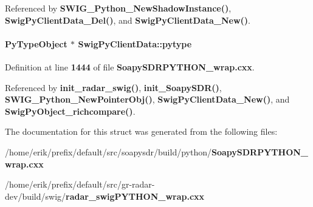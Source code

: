 Referenced by {\bf S\+W\+I\+G\+\_\+\+Python\+\_\+\+New\+Shadow\+Instance()}, {\bf Swig\+Py\+Client\+Data\+\_\+\+Del()}, and {\bf Swig\+Py\+Client\+Data\+\_\+\+New()}.

\paragraph[{pytype}]{\setlength{\rightskip}{0pt plus 5cm}Py\+Type\+Object $\ast$ Swig\+Py\+Client\+Data\+::pytype}\label{structSwigPyClientData_a489eefb474298d8b2c2e7d6d2583ca98}


Definition at line {\bf 1444} of file {\bf Soapy\+S\+D\+R\+P\+Y\+T\+H\+O\+N\+\_\+wrap.\+cxx}.



Referenced by {\bf init\+\_\+radar\+\_\+swig()}, {\bf init\+\_\+\+Soapy\+S\+D\+R()}, {\bf S\+W\+I\+G\+\_\+\+Python\+\_\+\+New\+Pointer\+Obj()}, {\bf Swig\+Py\+Client\+Data\+\_\+\+New()}, and {\bf Swig\+Py\+Object\+\_\+richcompare()}.



The documentation for this struct was generated from the following files\+:\begin{DoxyCompactItemize}
\item 
/home/erik/prefix/default/src/soapysdr/build/python/{\bf Soapy\+S\+D\+R\+P\+Y\+T\+H\+O\+N\+\_\+wrap.\+cxx}\item 
/home/erik/prefix/default/src/gr-\/radar-\/dev/build/swig/{\bf radar\+\_\+swig\+P\+Y\+T\+H\+O\+N\+\_\+wrap.\+cxx}\end{DoxyCompactItemize}
